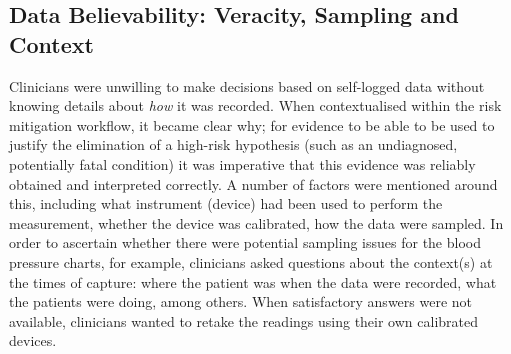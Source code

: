 \documentclass{sigchi}
\begin{document}



\subsection{Data Believability: Veracity, Sampling and Context}

Clinicians were unwilling to make decisions based on self-logged data without knowing details about \emph{how} it was recorded. When contextualised within the risk mitigation workflow, it became clear why; for evidence to be able to be used to justify the elimination of a high-risk hypothesis (such as an undiagnosed, potentially fatal condition) it was imperative that this evidence was reliably obtained and interpreted correctly.  A number of factors were mentioned around this, including what instrument (device) had been used to perform the measurement, whether the device was calibrated, how the data were sampled.  In order to ascertain whether there were potential sampling issues for the blood pressure charts, for example, clinicians asked questions about the context(s) at the times of capture: where the patient was when the data were recorded, what the patients were doing, among others.  When satisfactory answers were not available, clinicians wanted to retake the readings using their own calibrated devices.
\end{document}
